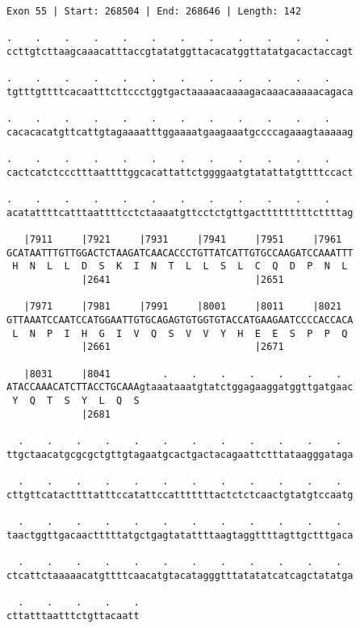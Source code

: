 \documentclass{article}
\begin{document}
\begin{Verbatim}[fontfamily=courier]
Exon 55 | Start: 268504 | End: 268646 | Length: 142

.    .    .    .    .    .    .    .    .    .    .    .    
ccttgtcttaagcaaacatttaccgtatatggttacacatggttatatgacactaccagt

.    .    .    .    .    .    .    .    .    .    .    .    
tgtttgttttcacaatttcttccctggtgactaaaaacaaaagacaaacaaaaacagaca

.    .    .    .    .    .    .    .    .    .    .    .    
cacacacatgttcattgtagaaaatttggaaaatgaagaaatgccccagaaagtaaaaag

.    .    .    .    .    .    .    .    .    .    .    .    
cactcatctccctttaattttggcacattattctggggaatgtatattatgttttccact

.    .    .    .    .    .    .    .    .    .    .    .    
acatattttcatttaattttcctctaaaatgttcctctgttgactttttttttcttttag

   |7911     |7921     |7931     |7941     |7951     |7961  
GCATAATTTGTTGGACTCTAAGATCAACACCCTGTTATCATTGTGCCAAGATCCAAATTT
 H  N  L  L  D  S  K  I  N  T  L  L  S  L  C  Q  D  P  N  L 
             |2641                         |2651            

   |7971     |7981     |7991     |8001     |8011     |8021  
GTTAAATCCAATCCATGGAATTGTGCAGAGTGTGGTGTACCATGAAGAATCCCCACCACA
 L  N  P  I  H  G  I  V  Q  S  V  V  Y  H  E  E  S  P  P  Q 
             |2661                         |2671            

   |8031     |8041         .    .    .    .    .    .    .  
ATACCAAACATCTTACCTGCAAAgtaaataaatgtatctggagaaggatggttgatgaac
 Y  Q  T  S  Y  L  Q  S                                     
             |2681                                          

  .    .    .    .    .    .    .    .    .    .    .    .  
ttgctaacatgcgcgctgttgtagaatgcactgactacagaattctttataagggataga

  .    .    .    .    .    .    .    .    .    .    .    .  
cttgttcatacttttatttccatattccatttttttactctctcaactgtatgtccaatg

  .    .    .    .    .    .    .    .    .    .    .    .  
taactggttgacaactttttatgctgagtatattttaagtaggttttagttgctttgaca

  .    .    .    .    .    .    .    .    .    .    .    .  
ctcattctaaaaacatgttttcaacatgtacatagggtttatatatcatcagctatatga

  .    .    .    .    .
cttatttaatttctgttacaatt
\end{Verbatim}
\newpage
\end{document}
